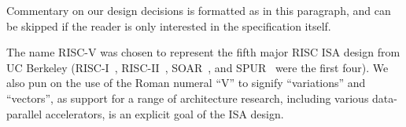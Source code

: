 \begin{commentary}
Commentary on our design decisions is formatted as in this paragraph,
and can be skipped if the reader is only interested in the
specification itself.
\end{commentary}
\begin{commentary}
The name RISC-V was chosen to represent the fifth major RISC ISA
design from UC Berkeley (RISC-I~\cite{riscI-isca1981},
RISC-II~\cite{Katevenis:1983}, SOAR~\cite{Ungar:1984}, and
SPUR~\cite{spur-jsscc1989} were the first four).  We also pun on the
use of the Roman numeral ``V'' to signify ``variations'' and
``vectors'', as support for a range of architecture research,
including various data-parallel accelerators, is an explicit goal of
the ISA design.
\end{commentary}

